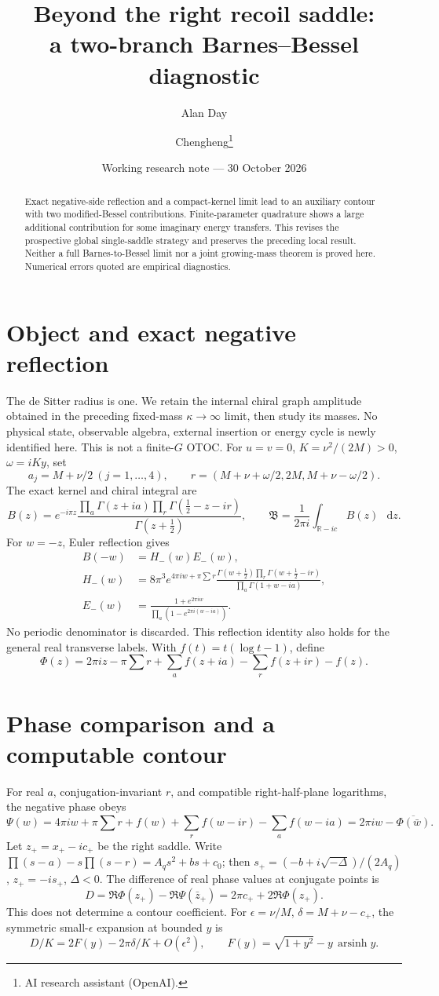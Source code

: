 \documentclass[11pt,a4paper]{article}
\title{Beyond the right recoil saddle:\\a two-branch Barnes--Bessel diagnostic}
\author{Alan Day \and Chengheng\thanks{AI research assistant (OpenAI).}}
\date{Working research note --- 30 October 2026}
\newcommand{\dd}{\mathop{}\!\mathrm d}
\begin{document}
\maketitle
\begin{abstract}
Exact negative-side reflection and a compact-kernel limit lead to an
auxiliary contour with two modified-Bessel contributions. Finite-parameter
quadrature shows a large additional contribution for some imaginary
energy transfers. This revises the prospective global single-saddle
strategy and preserves the preceding local result. Neither a full
Barnes-to-Bessel limit nor a joint growing-mass theorem is proved here.
Numerical errors quoted are empirical diagnostics.
\end{abstract}
\section{Object and exact negative reflection}
The de Sitter radius is one. We retain the internal chiral graph amplitude
obtained in the preceding fixed-mass \(\kappa\to\infty\) limit, then study
its masses. No physical state, observable algebra, external insertion or
energy cycle is newly identified here. This is not a finite-\(G\) OTOC.
For \(u=v=0\), \(K=\nu^2/(2M)>0\), \(\omega=iKy\), set
\[
 a_j=M+\nu/2\ (j=1,\ldots,4),\qquad
 r=(M+\nu+\omega/2,2M,M+\nu-\omega/2).
\]
The exact kernel and chiral integral are
\[
 B(z)=e^{-i\pi z}
 \frac{\prod_a\Gamma(z+ia)\prod_r\Gamma(\tfrac12-z-ir)}
 {\Gamma(z+\tfrac12)},\qquad
 \mathfrak B=\frac1{2\pi i}\int_{\mathbb R-ic}B(z)\,\dd z.
\]
For \(w=-z\), Euler reflection \cite{gamma} gives
\begin{align}
 B(-w)&=H_-(w)E_-(w),\\
 H_-(w)&=8\pi^3e^{4\pi iw+\pi\sum r}
 \frac{\Gamma(w+\tfrac12)\prod_r\Gamma(w+\tfrac12-ir)}
 {\prod_a\Gamma(1+w-ia)},\\
 E_-(w)&=\frac{1+e^{2\pi iw}}
 {\prod_a(1-e^{2\pi i(w-ia)})}.
\end{align}
No periodic denominator is discarded. This reflection identity also
holds for the general real transverse labels.
With \(f(t)=t(\log t-1)\), define
\[
 \Phi(z)=2\pi iz-\pi\sum r+\sum_a f(z+ia)-\sum_r f(z+ir)-f(z).
\]

\newpage
\section{Phase comparison and a computable contour}
For real \(a\), conjugation-invariant \(r\), and compatible
right-half-plane logarithms, the negative phase obeys
\[
 \Psi(w)=4\pi iw+\pi\sum r+f(w)+\sum_r f(w-ir)-\sum_a f(w-ia)
        =2\pi iw-\overline{\Phi(\bar w)}.
\]
Let \(z_+=x_+-ic_+\) be the right saddle. Write
\(\prod(s-a)-s\prod(s-r)=A_qs^2+bs+c_0\);
then \(s_+=(-b+i\sqrt{-\Delta})/(2A_q)\), \(z_+=-is_+\), \(\Delta<0\).
The difference of real phase values at conjugate points is
\[
 D=\Re\Phi(z_+)-\Re\Psi(\bar z_+)=2\pi c_++2\Re\Phi(z_+).
\]
This does not determine a contour coefficient.
For \(\epsilon=\nu/M\), \(\delta=M+\nu-c_+\), the symmetric
small-\(\epsilon\) expansion at bounded \(y\) is
\[
 D/K=2F(y)-2\pi\delta/K+O(\epsilon^2),\qquad
 F(y)=\sqrt{1+y^2}-y\,\operatorname{arsinh}y.
\]
\end{document}
